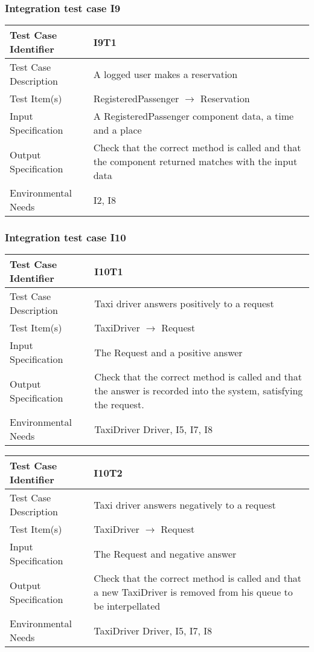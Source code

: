 		\subsubsection{Integration test case I9}
		\begin{center}
			\begin{tabular}{ |l p{10cm}| } \hline
				Test Case Identifier & I9T1 \\ \hline
				Test Case Description & A logged user makes a reservation \\ \hline
				Test Item(s) & RegisteredPassenger $\rightarrow$ Reservation \\ \hline
				Input Specification & A RegisteredPassenger component data, a time and a place \\ \hline
				Output Specification & Check that the correct method is called and that the component returned matches
				with the input data \\ \hline
				Environmental Needs & I2, I8 \\ \hline
			\end{tabular}
		\end{center}
		\subsubsection{Integration test case I10}
		\begin{center}
			\begin{tabular}{ |l p{10cm}| } \hline
				Test Case Identifier & I10T1 \\ \hline
				Test Case Description & Taxi driver answers positively to a request \\ \hline
				Test Item(s) & TaxiDriver $\rightarrow$ Request \\ \hline
				Input Specification & The Request and a positive answer \\ \hline
				Output Specification & Check that the correct method is called and that the answer is recorded
				into the system, satisfying the request. \\ \hline
				Environmental Needs & TaxiDriver Driver, I5, I7, I8 \\ \hline
			\end{tabular}
			\begin{tabular}{ |l p{10cm}| } \hline
				Test Case Identifier & I10T2 \\ \hline
				Test Case Description & Taxi driver answers negatively to a request \\ \hline
				Test Item(s) & TaxiDriver $\rightarrow$ Request \\ \hline
				Input Specification & The Request and negative answer \\ \hline
				Output Specification & Check that the correct method is called and that a new TaxiDriver is 
				removed from his queue to be interpellated \\ \hline
				Environmental Needs & TaxiDriver Driver, I5, I7, I8 \\ \hline
			\end{tabular}
		\end{center}
